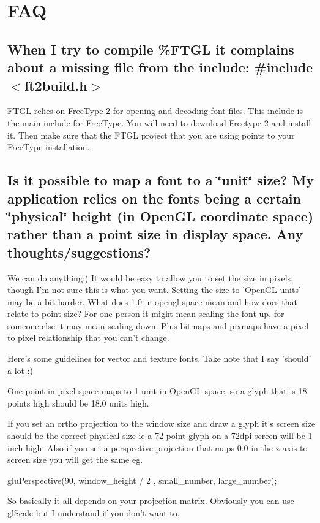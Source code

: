 \section{FAQ}\label{ftgl-faq_faq}
\subsection{When I try to compile \%FTGL it complains about a missing file from the include: \#include $<$ft2build.h$>$}\label{ftgl-faq_faq1}
FTGL relies on FreeType 2 for opening and decoding font files. This include is the main include for FreeType. You will need to download Freetype 2 and install it. Then make sure that the FTGL project that you are using points to your FreeType installation.\subsection{Is it possible to map a font to a \char`\"{}unit\char`\"{} size? My application relies on the fonts being a certain \char`\"{}physical\char`\"{} height (in OpenGL coordinate space) rather than a point size in display space. Any thoughts/suggestions?}\label{ftgl-faq_faq2}
We can do anything:) It would be easy to allow you to set the size in pixels, though I'm not sure this is what you want. Setting the size to 'OpenGL units' may be a bit harder. What does 1.0 in opengl space mean and how does that relate to point size? For one person it might mean scaling the font up, for someone else it may mean scaling down. Plus bitmaps and pixmaps have a pixel to pixel relationship that you can't change.

Here's some guidelines for vector and texture fonts. Take note that I say 'should' a lot :)


\begin{DoxyItemize}
\item One point in pixel space maps to 1 unit in OpenGL space, so a glyph that is 18 points high should be 18.0 units high.
\end{DoxyItemize}


\begin{DoxyItemize}
\item If you set an ortho projection to the window size and draw a glyph it's screen size should be the correct physical size ie a 72 point glyph on a 72dpi screen will be 1 inch high. Also if you set a perspective projection that maps 0.0 in the z axis to screen size you will get the same eg. 
\begin{DoxyCode}
gluPerspective(90, window_height / 2 , small_number, large_number);
\end{DoxyCode}
 So basically it all depends on your projection matrix. Obviously you can use glScale but I understand if you don't want to.
\end{DoxyItemize}

